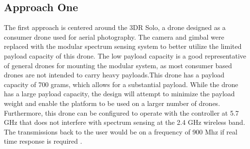 \subsection{Approach One}
The first approach is centered around the 3DR Solo, a drone designed as a consumer drone used for aerial photography. The camera and gimbal were replaced with the modular spectrum sensing system to better utilize the limited payload capacity of this drone. The low payload capacity is a good representative of general drones for mounting the modular system, as most consumer based drones are not intended to carry heavy payloads.This drone has a payload capacity of 700 grams, which allows for a substantial payload. While the drone has a large payload capacity, the design will attempt to minimize the payload weight and enable the platform to be used on a larger number of drones. Furthermore, this drone can be configured to operate with the controller at 5.7 GHz that does not interfere with spectrum sensing at the 2.4 GHz wireless band. The transmissions back to the user would be on a frequency of 900 Mhz if real time response is required \cite{3dr_Website}.

